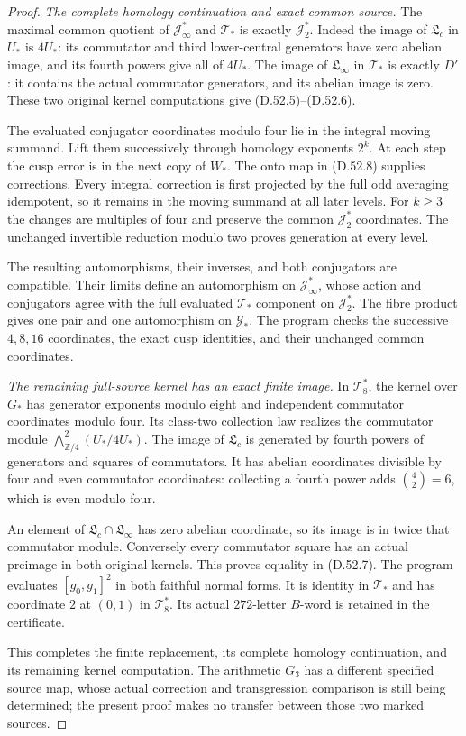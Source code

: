 \begin{proof}
\emph{The complete homology continuation and exact common source.}
The maximal common quotient of
\(\mathcal J_\infty^*\) and \(\mathcal T_*\)
is exactly \(\mathcal J_2^*\).
Indeed the image of \(\mathfrak L_c\)
in \(U_*\) is \(4U_*\): its commutator
and third lower-central generators have
zero abelian image, and its fourth powers
give all of \(4U_*\).
The image of \(\mathfrak L_\infty\) in
\(\mathcal T_*\) is exactly \(D'\):
it contains the actual commutator generators,
and its abelian image is zero.
These two original kernel computations
give (D.52.5)--(D.52.6).

The evaluated conjugator coordinates modulo
four lie in the integral moving summand.
Lift them successively through homology
exponents \(2^k\). At each step the cusp
error is in the next copy of \(W_*\).
The onto map in (D.52.8) supplies corrections.
Every integral correction is first projected
by the full odd averaging idempotent, so
it remains in the moving summand at all
later levels. For \(k\ge3\) the changes
are multiples of four and preserve the
common \(\mathcal J_2^*\) coordinates.
The unchanged invertible reduction modulo
two proves generation at every level.

The resulting automorphisms, their inverses,
and both conjugators are compatible.
Their limits define an automorphism on
\(\mathcal J_\infty^*\), whose action and
conjugators agree with the full evaluated
\(\mathcal T_*\) component on
\(\mathcal J_2^*\). The fibre product gives
one pair and one automorphism on
\(\mathcal Y_*\). The program checks
the successive \(4,8,16\) coordinates,
the exact cusp identities, and their
unchanged common coordinates.

\emph{The remaining full-source kernel has an exact finite image.}
In \(\mathcal T_8^*\), the kernel over
\(G_*\) has generator exponents modulo
eight and independent commutator coordinates
modulo four. Its class-two collection law
realizes the commutator module
\(\bigwedge^2_{\mathbb Z/4}(U_*/4U_*)\).
The image of \(\mathfrak L_c\) is generated
by fourth powers of generators and squares
of commutators. It has abelian coordinates
divisible by four and even commutator
coordinates: collecting a fourth power
adds \(\binom42=6\), which is even modulo four.

An element of
\(\mathfrak L_c\cap\mathfrak L_\infty\)
has zero abelian coordinate, so its image
is in twice that commutator module.
Conversely every commutator square has an
actual preimage in both original kernels.
This proves equality in (D.52.7).
The program evaluates \([g_0,g_1]^2\)
in both faithful normal forms. It is
identity in \(\mathcal T_*\) and has
coordinate \(2\) at \((0,1)\) in
\(\mathcal T_8^*\). Its actual \(272\)-letter
\(B\)-word is retained in the certificate.

This completes the finite replacement,
its complete homology continuation, and
its remaining kernel computation. The
arithmetic \(G_3\) has a different specified
source map, whose actual correction and
transgression comparison is still being
determined; the present proof makes no
transfer between those two marked sources.
\end{proof}

